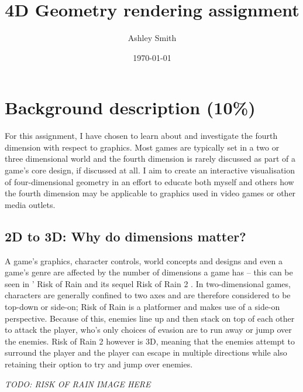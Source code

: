 \documentclass[11pt, a4paper]{article}
\begin{document}
\title{\titlefont 4D Geometry rendering assignment}
\author{Ashley Smith}
\date{\today}
\maketitle
\thispagestyle{empty}


\cleardoublepage
\setcounter{page}{1}
\tableofcontents

\cleardoublepage
{}
\setcounter{page}{1}

\section{Background description (10\%)}

For this assignment, I have chosen to learn about and investigate the fourth dimension with respect to graphics. Most games are typically set in a two or three dimensional world and the fourth dimension is rarely discussed as part of a game's core design, if discussed at all. I aim to create an interactive visualisation of four-dimensional geometry in an effort to educate both myself and others how the fourth dimension may be applicable to graphics used in video games or other media outlets.

\subsection{2D to 3D: Why do dimensions matter?}

A game's graphics, character controls, world concepts and designs and even a game's genre are affected by the number of dimensions a game has -- this can be seen in \citeauthor*{riskofrain}' Risk of Rain \parencite*{riskofrain} and its sequel Risk of Rain 2 \parencite{riskofrain2}. In two-dimensional games, characters are generally confined to two axes and are therefore considered to be top-down or side-on; Risk of Rain is a platformer and makes use of a side-on perspective. Because of this, enemies line up and then stack on top of each other to attack the player, who's only choices of evasion are to run away or jump over the enemies. Risk of Rain 2 however is 3D, meaning that the enemies attempt to surround the player and the player can escape in multiple directions while also retaining their option to try and jump over enemies.

\emph{TODO: RISK OF RAIN IMAGE HERE}
\end{document}
